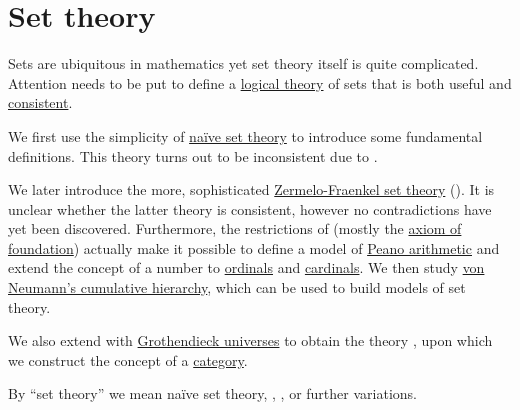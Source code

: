\section{Set theory}\label{sec:set_theory}

Sets are ubiquitous in mathematics yet set theory itself is quite complicated. Attention needs to be put to define a \hyperref[def:first_order_theory]{logical theory} of sets that is both useful and \hyperref[def:first_order_theory_consistency]{consistent}.

We first use the simplicity of \hyperref[def:naive_set_theory]{na\"ive set theory} to introduce some fundamental definitions. This theory turns out to be inconsistent due to .

We later introduce the more, sophisticated \hyperref[def:zfc]{Zermelo-Fraenkel set theory} (). It is unclear whether the latter theory is consistent, however no contradictions have yet been discovered. Furthermore, the restrictions of  (mostly the \hyperref[def:zfc/foundation]{axiom of foundation}) actually make it possible to define a model of \hyperref[def:peano_arithmetic]{Peano arithmetic} and extend the concept of a number to \hyperref[def:ordinal]{ordinals} and \hyperref[def:cardinals]{cardinals}. We then study \hyperref[def:cumulative_hierarchy]{von Neumann's cumulative hierarchy}, which can be used to build models of set theory.

We also extend  with \hyperref[def:grothendieck_universe]{Grothendieck universes} to obtain the theory \hyperref[def:axiom_of_universes]{}, upon which we construct the concept of a \hyperref[def:category]{category}.

By \enquote{set theory} we mean na\"ive set theory, , ,  or further variations.

